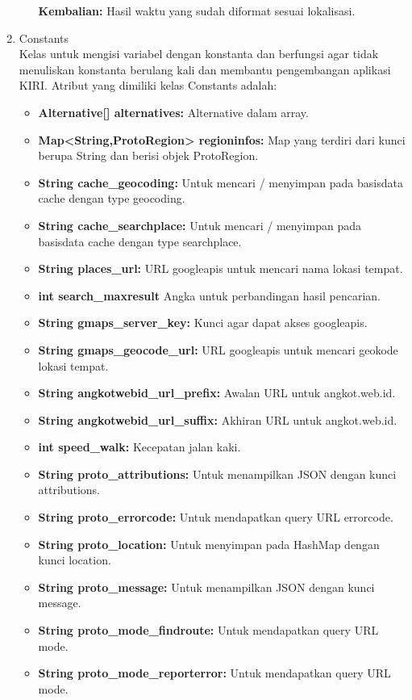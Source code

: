 \begin{enumerate}
\begin{itemize}
		\textbf{Kembalian:}  Hasil waktu yang sudah diformat sesuai lokalisasi.
	\end{itemize}
	\item Constants\\
	Kelas untuk mengisi variabel dengan konstanta dan berfungsi agar tidak menuliskan konstanta berulang kali dan membantu pengembangan aplikasi KIRI. Atribut yang dimiliki kelas Constants adalah:
	\begin{itemize}
		\item \textbf{Alternative[] alternatives:} Alternative dalam array.
		\item \textbf{Map<String,ProtoRegion> regioninfos:} Map yang terdiri dari kunci berupa String dan berisi objek ProtoRegion.
		\item \textbf{String cache\_geocoding:} Untuk mencari / menyimpan pada basisdata cache dengan type geocoding.
		\item \textbf{String cache\_searchplace:} Untuk mencari / menyimpan pada basisdata cache dengan type searchplace.
		\item \textbf{String places\_url:} URL googleapis untuk mencari nama lokasi tempat.
		\item \textbf{int search\_maxresult} Angka untuk perbandingan hasil pencarian.
		\item \textbf{String gmaps\_server\_key:} Kunci agar dapat akses googleapis.
		\item \textbf{String gmaps\_geocode\_url:} URL googleapis untuk mencari geokode lokasi tempat.
		\item \textbf{String angkotwebid\_url\_prefix:} Awalan URL untuk angkot.web.id.
		\item \textbf{String angkotwebid\_url\_suffix:} Akhiran URL untuk angkot.web.id.
		\item \textbf{int speed\_walk:} Kecepatan jalan kaki.
		\item \textbf{String proto\_attributions:} Untuk menampilkan JSON dengan kunci attributions. 
		\item \textbf{String proto\_errorcode:} Untuk mendapatkan query URL errorcode.
		\item \textbf{String proto\_location:} Untuk menyimpan pada HashMap dengan kunci location.
		\item \textbf{String proto\_message:} Untuk menampilkan JSON dengan kunci message.
		\item \textbf{String proto\_mode\_findroute:} Untuk mendapatkan query URL mode.
		\item \textbf{String proto\_mode\_reporterror:} Untuk mendapatkan query URL mode.

\end{itemize}
\end{enumerate}
